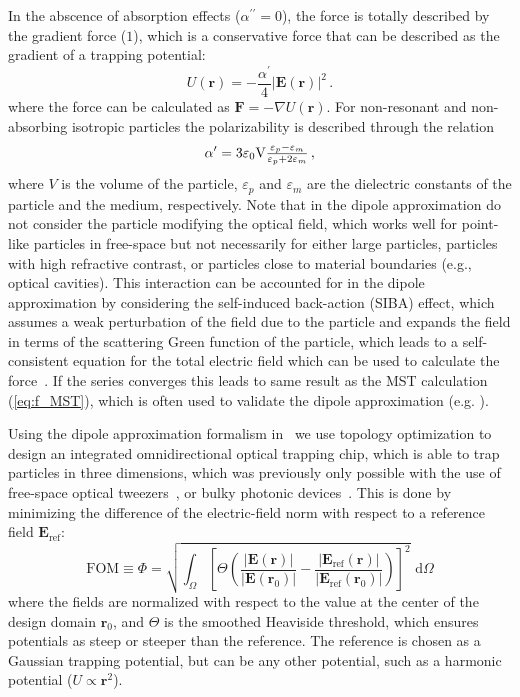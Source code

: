 In the abscence of absorption effects ($\alpha^{\prime \prime}=0$), the force is totally described 
by the gradient force ($1$), which is a conservative force that can be described as the gradient 
of a trapping potential:
\begin{equation*}
    U (\mathbf{r}) = -\frac{\alpha^{\prime}}{4} \left|\mathbf{E}(\mathbf{r})\right|^2\,.
\end{equation*}
where the force can be calculated as $\mathbf{F} = -\nabla U(\mathbf{r})$. 
For non-resonant and non-absorbing isotropic particles the polarizability is 
described through the relation~\cite{BornWolf:1999:Book}
\begin{equation}
    \alpha^{\prime}= 3 \varepsilon_0 $V$ \frac{\varepsilon_p-\varepsilon_m}{\varepsilon_p+2 \varepsilon_m}\,,
\end{equation}
where $V$ is the volume of the particle, $\varepsilon_p$ and $\varepsilon_m$ are the
dielectric constants of the particle and the medium, respectively. Note that in the dipole approximation do not consider the particle modifying
the optical field, which works well for point-like particles in free-space but not necessarily 
for either large particles, particles with high refractive contrast, or particles close to material
boundaries (e.g., optical cavities). This interaction can be accounted for in the dipole
approximation by considering the self-induced back-action (SIBA) effect, which assumes a weak
perturbation of the field due to the particle and expands the field in terms of 
the scattering Green function of the particle, which leads to a self-consistent
equation for the total electric field which can be used to calculate the force~\cite{novotny, SIBA, benjamin}. If the series converges this leads 
to same result as the MST calculation (\eqref{eq:f_MST}), which is often used to validate the dipole approximation (e.g. \cite{ownpub1,ownpub3}). 


Using the dipole approximation formalism in~\cite{ownpub1} we use topology optimization to design an integrated omnidirectional optical trapping chip, which is able to trap particles in three dimensions,
which was previously only possible with the use of free-space optical tweezers~\cite{ashkin_acceleration_1970}, or bulky photonic devices~\cite{manka_simulation_2024}. This is done by minimizing 
the difference of the electric-field norm with respect to a reference field $\mathbf{E}_\text{ref}$:
\begin{equation}
    \text{FOM} \equiv \Phi=\sqrt{\int_{\Omega}\left[\Theta\left(\frac{|\mathbf{E}(\mathbf{r})|}{\left|\mathbf{E}\left(\mathbf{r}_0\right)\right|}-\frac{\left|\mathbf{E}_{\text{ref}}(\mathbf{r})\right|}{\left|\mathbf{E}_{\text{ref}}\left(\mathbf{r}_0\right)\right|}\right)\right]^2} \text{~d} \Omega
    \end{equation}
where the fields are normalized with respect to the value at the center of the design domain $\mathbf{r}_0$, and $\Theta$ is the smoothed Heaviside threshold, which ensures
potentials as steep or steeper than the reference. The reference is chosen as a Gaussian trapping potential, but can be any other potential, such as a harmonic potential ($U\propto\mathbf{r}^2$).

